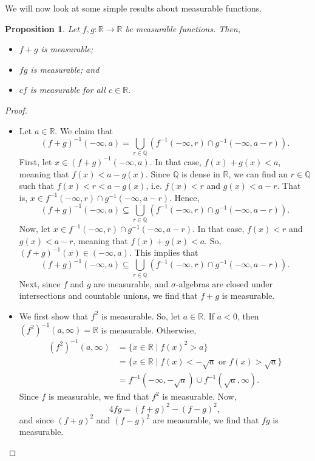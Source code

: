 \documentclass[a4paper, openany]{memoir}
\theoremstyle{definition}
\theoremstyle{plain}
\newtheorem{proposition}[definition]{Proposition}
\begin{document}
    We will now look at some simple results about measurable functions.
    \begin{proposition}
        Let $f, g \colon \mathbb{R} \to \mathbb{R}$ be measurable functions. Then,
        \begin{itemize}
            \item $f + g$ is measurable;
            \item $fg$ is measurable; and
            \item $cf$ is measurable for all $c \in \mathbb{R}$.
        \end{itemize}
    \end{proposition}
    \begin{proof}
        \hspace*{0pt}
        \begin{itemize}
            \item Let $a \in \mathbb{R}$. We claim that
            \[(f + g)^{-1} (-\infty, a) = \bigcup_{r \in \mathbb{Q}} (f^{-1}(-\infty, r) \cap g^{-1}(-\infty, a - r)).\]
            First, let $x \in (f + g)^{-1} (-\infty, a)$. In that case, $f(x) + g(x) < a$, meaning that $f(x) < a - g(x)$. Since $\mathbb{Q}$ is dense in $\mathbb{R}$, we can find an $r \in \mathbb{Q}$ such that $f(x) < r < a - g(x)$, i.e. $f(x) < r$ and $g(x) < a - r$. That is, $x \in f^{-1}(-\infty, r) \cap g^{-1}(-\infty, a -r)$. Hence,
            \[(f + g)^{-1} (-\infty, a) \subseteq \bigcup_{r \in \mathbb{Q}} (f^{-1}(-\infty, r) \cap g^{-1}(-\infty, a - r)).\]
            Now, let $x \in f^{-1}(-\infty, r) \cap g^{-1}(-\infty, a - r)$. In that case, $f(x) < r$ and $g(x) < a - r$, meaning that $f(x) + g(x) < a$. So, $(f + g)^{-1}(x) \in (-\infty, a)$. This implies that 
            \[(f + g)^{-1} (-\infty, a) \subseteq \bigcup_{r \in \mathbb{Q}} (f^{-1}(-\infty, r) \cap g^{-1}(-\infty, a - r)).\]
            Next, since $f$ and $g$ are measurable, and $\sigma$-algebras are closed under intersections and countable unions, we find that $f + g$ is measurable.

            \item We first show that $f^2$ is measurable. So, let $a \in \mathbb{R}$. If $a < 0$, then $(f^2)^{-1}(a, \infty) = \mathbb{R}$ is measurable. Otherwise,
            \begin{align*}
                (f^2)^{-1}(a, \infty) &= \{x \in \mathbb{R} \mid f(x)^2 > a\} \\
                &= \{x \in \mathbb{R} \mid f(x) < -\sqrt{a} \textrm{ or } f(x) > \sqrt{a}\} \\
                &= f^{-1}(-\infty, -\sqrt{a}) \cup f^{-1}(\sqrt{a}, \infty).
            \end{align*}
            Since $f$ is measurable, we find that $f^2$ is measurable. Now, 
            \[4fg = (f + g)^2 - (f - g)^2,\]
            and since $(f + g)^2$ and $(f - g)^2$ are measurable, we find that $fg$ is measurable.


\end{itemize}
\end{proof}
\end{document}
